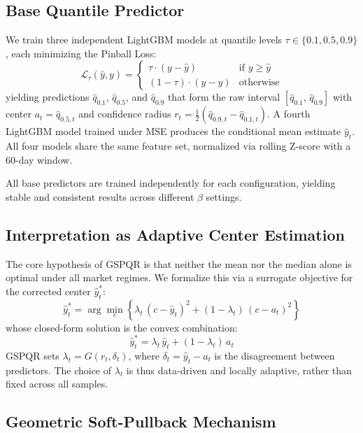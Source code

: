 \documentclass[12pt, a4paper]{article}
\begin{document}
\subsection{Base Quantile Predictor}

We train three independent LightGBM models at quantile levels
$\tau \in \{0.1, 0.5, 0.9\}$, each minimizing the Pinball Loss:
%
\begin{equation}
\mathcal{L}_\tau(\hat{y}, y) =
\begin{cases}
\tau \cdot (y - \hat{y}) & \text{if } y \geq \hat{y} \\
(1 - \tau) \cdot (\hat{y} - y) & \text{otherwise}
\end{cases}
\end{equation}
%
yielding predictions $\hat{q}_{0.1}$, $\hat{q}_{0.5}$, and $\hat{q}_{0.9}$ that form
the raw interval $[\hat{q}_{0.1},\, \hat{q}_{0.9}]$ with center $a_t = \hat{q}_{0.5,t}$
and confidence radius $r_t = \frac{1}{2}(\hat{q}_{0.9,t} - \hat{q}_{0.1,t})$.
A fourth LightGBM model trained under MSE produces the conditional mean estimate
$\hat{y}_t$. All four models share the same feature set, normalized via rolling
Z-score with a 60-day window.

All base predictors are trained independently for each configuration, 
yielding stable and consistent results across different $\beta$ settings.

\subsection{Interpretation as Adaptive Center Estimation}

The core hypothesis of GSPQR is that neither the mean nor the median alone is optimal
under all market regimes. We formalize this via a surrogate objective for the corrected
center $\hat{y}^*_t$:
%
\begin{equation}
\hat{y}^*_t = \arg\min_{c}
\left\{ \lambda_t\,(c - \hat{y}_t)^2 + (1-\lambda_t)\,(c - a_t)^2 \right\}
\end{equation}
%
whose closed-form solution is the convex combination:
%
\begin{equation}
\hat{y}^*_t = \lambda_t\,\hat{y}_t + (1-\lambda_t)\,a_t
\end{equation}
%
GSPQR sets $\lambda_t = G(r_t, \delta_t)$, where $\delta_t = \hat{y}_t - a_t$ is the
disagreement between predictors. The choice of $\lambda_t$ is thus data-driven and
locally adaptive, rather than fixed across all samples.

\subsection{Geometric Soft-Pullback Mechanism}
\label{sec:pullback}
\end{document}
